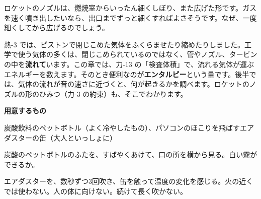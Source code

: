 
\begin{hatena}
\noindent\begin{minipage}[c]{0.56\linewidth}\raggedright
ロケットのノズルは、燃焼室からいったん細くしぼり、また広げた形です。ガスを速く噴き出したいなら、出口までずっと細くすればよさそうです。なぜ、一度細くしてから広げるのでしょう。
\end{minipage}\hfill
\begin{minipage}[c]{0.42\linewidth}\centering
{}
\end{minipage}
\end{hatena}

\noindent 熱-3 では、ピストンで閉じこめた気体をふくらませたり縮めたりしました。工学で使う気体の多くは、閉じこめられているのではなく、管やノズル、タービンの中を\textbf{流れて}います。この章では、力-13 の「検査体積」で、流れる気体が運ぶエネルギーを数えます。そのとき便利なのが\textbf{エンタルピー}という量です。後半では、気体の流れが音の速さに近づくと、何が起きるかを調べます。ロケットのノズルの形のひみつ（力-3 の約束）も、そこでわかります。

\begin{yattemiyou}[吹き出す気体の温度を感じよう]
\textbf{用意するもの}\par
炭酸飲料のペットボトル（よく冷やしたもの）、パソコンのほこりを飛ばすエアダスターの缶（大人といっしょに）
\begin{enumerate}[label={\bkcircled[bkGreen]{\arabic*}}, leftmargin=2.4\zw, itemsep=1pt, topsep=2pt]
\item 炭酸のペットボトルのふたを、すばやくあけて、口の所を横から見る。白い霧ができるか。
\item エアダスターを、数秒ずつ3回吹き、缶を触って温度の変化を感じる。火の近くでは使わない。人の体に向けない。続けて長く吹かない。
\end{enumerate}
\end{yattemiyou}

